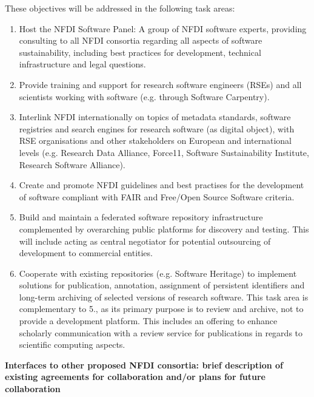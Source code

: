 \documentclass[11pt,a4paper,DIV=11]{scrlttr2}
\begin{document}
\begin{letter}{}
These objectives will be addressed in the following task areas:
\begin{enumerate}
 \item Host the NFDI Software Panel: A group of NFDI software experts, providing consulting to all NFDI consortia regarding all aspects of software sustainability, including best practices for development, technical infrastructure and legal questions.
 \item Provide training and support for research software engineers (RSEs) and all scientists  working with software (e.g. through Software Carpentry).
 \item Interlink NFDI internationally on topics of metadata standards, software registries and search engines for research software (as digital object), with RSE organisations and other stakeholders on European and international levels (e.g. Research Data Alliance, Force11, Software Sustainability Institute, Research Software Alliance).
 \item Create and promote NFDI guidelines and best practises for the development of software compliant with FAIR and Free/Open Source Software criteria.
 \item Build and maintain a federated software repository infrastructure complemented by overarching public platforms for discovery and testing. This will include acting as central negotiator for potential outsourcing of development to commercial entities.
 \item Cooperate with existing repositories (e.g. Software Heritage) to implement solutions for publication, annotation, assignment of persistent identifiers and long-term archiving of selected versions of research software. This task area is complementary to 5., as its primary purpose is to review and archive, not to provide a development platform. This includes an offering to enhance scholarly communication with a review service for publications in regards to scientific computing aspects.
\end{enumerate}

\clearpage
\textbf{Interfaces to other proposed NFDI consortia: brief description of existing agreements for collaboration and/or plans for future collaboration}\\


\end{letter}
\end{document}
